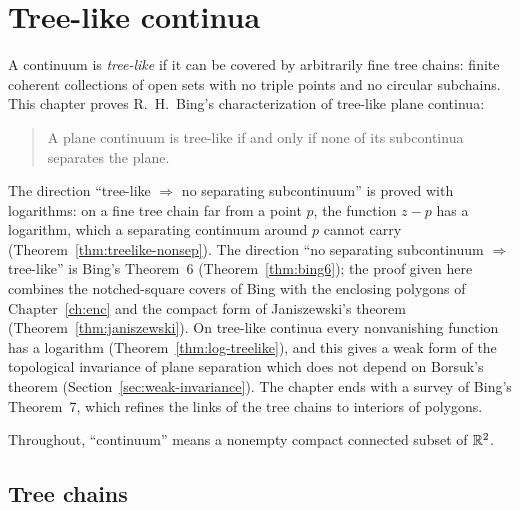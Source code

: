 \chapter{Tree-like continua}\label{ch:tree}

A continuum is \emph{tree-like} if it can be covered by arbitrarily fine tree chains: finite
coherent collections of open sets with no triple points and no circular subchains. This chapter
proves R.~H.~Bing's characterization of tree-like plane continua:

\begin{quote}
A plane continuum is tree-like if and only if none of its subcontinua separates the plane.
\end{quote}

The direction ``tree-like $\Rightarrow$ no separating subcontinuum'' is proved with logarithms: on a
fine tree chain far from a point $p$, the function $z-p$ has a logarithm, which a separating
continuum around $p$ cannot carry (Theorem~\ref{thm:treelike-nonsep}). The direction ``no separating
subcontinuum $\Rightarrow$ tree-like'' is Bing's Theorem~6 (Theorem~\ref{thm:bing6}); the proof given
here combines the notched-square covers of Bing with the enclosing polygons of
Chapter~\ref{ch:enc} and the compact form of Janiszewski's theorem (Theorem~\ref{thm:janiszewski}).
On tree-like continua every nonvanishing function has a logarithm
(Theorem~\ref{thm:log-treelike}), and this gives a weak form of the topological invariance of plane
separation which does not depend on Borsuk's theorem (Section~\ref{sec:weak-invariance}). The
chapter ends with a survey of Bing's Theorem~7, which refines the links of the tree chains to
interiors of polygons.

Throughout, ``continuum'' means a nonempty compact connected subset of $\mathbb{R}^2$.

\section{Tree chains}

